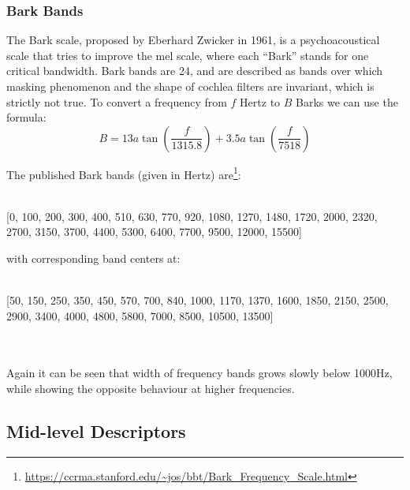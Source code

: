\subsubsection{Bark Bands}
The Bark scale, proposed by Eberhard Zwicker in 1961, is a psychoacoustical scale that tries to improve the mel scale, where each ``Bark'' stands for one critical bandwidth. Bark bands are 24, and are described as bands over which masking phenomenon and the shape of cochlea filters are invariant, which is strictly not true. To convert a frequency from $f$ Hertz to $B$ Barks we can use the formula:
\begin{equation}
B = 13a\tan \left(\frac{f}{1315.8} \right) + 3.5a\tan \left( \frac{f}{7518} \right)
\end{equation}

The published Bark bands (given in Hertz) are\footnote{\url{https://ccrma.stanford.edu/~jos/bbt/Bark_Frequency_Scale.html}}:\\ \\
\hfill\begin{minipage}{\dimexpr\textwidth-1.5cm}
[0, 100, 200, 300, 400, 510, 630, 770, 920, 1080, 1270, 1480, 1720, 2000, 2320, 2700, 3150, 3700, 4400, 5300, 6400, 7700, 9500, 12000, 15500]
\xdef\tpd{\the\prevdepth}
\end{minipage}

with corresponding band centers at:\\ \\
\hfill\begin{minipage}{\dimexpr\textwidth-1.5cm}
[50, 150, 250, 350, 450, 570, 700, 840, 1000, 1170, 1370, 1600, 1850, 2150, 2500, 2900, 3400, 4000, 4800, 5800, 7000, 8500, 10500, 13500]
\xdef\tpd{\the\prevdepth}
\end{minipage}
\\ \\
Again it can be seen that width of frequency bands grows slowly below 1000Hz, while showing the opposite behaviour at higher frequencies. 

\subsection{Mid-level Descriptors}
